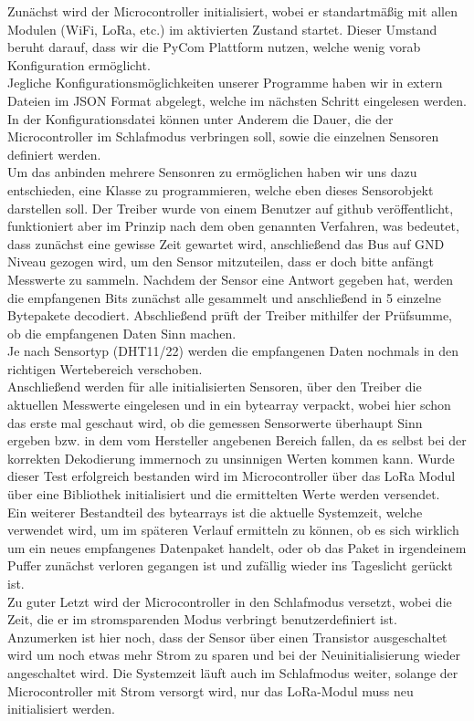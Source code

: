 Zunächst wird der Microcontroller initialisiert, wobei er standartmäßig mit allen Modulen (WiFi, LoRa, etc.) im aktivierten Zustand startet. Dieser Umstand beruht darauf, dass wir die PyCom Plattform nutzen, welche wenig vorab Konfiguration ermöglicht.\\
Jegliche Konfigurationsmöglichkeiten unserer Programme haben wir in extern Dateien im JSON Format abgelegt, welche im nächsten Schritt eingelesen werden. In der Konfigurationsdatei können unter Anderem die Dauer, die der Microcontroller im Schlafmodus verbringen soll, sowie die einzelnen Sensoren definiert werden.\\
Um das anbinden mehrere Sensonren zu ermöglichen haben wir uns dazu entschieden, eine Klasse zu programmieren, welche eben dieses Sensorobjekt darstellen soll. Der Treiber wurde von einem Benutzer auf github veröffentlicht\cite{dhtlib}, funktioniert aber im Prinzip nach dem oben genannten Verfahren, was bedeutet, dass zunächst eine gewisse Zeit gewartet wird, anschließend das Bus auf GND Niveau gezogen wird, um den Sensor mitzuteilen, dass er doch bitte anfängt Messwerte zu sammeln. Nachdem der Sensor eine Antwort gegeben hat, werden die empfangenen Bits zunächst alle gesammelt und anschließend in 5 einzelne Bytepakete decodiert. Abschließend prüft der Treiber mithilfer der Prüfsumme, ob die empfangenen Daten Sinn machen.\\ Je nach Sensortyp (DHT11/22) werden die empfangenen Daten nochmals in den richtigen Wertebereich \grqq verschoben\grqq.\\
Anschließend werden für alle initialisierten Sensoren, über den Treiber die aktuellen Messwerte eingelesen und in ein bytearray verpackt, wobei hier schon das erste mal geschaut wird, ob die gemessen Sensorwerte überhaupt Sinn ergeben bzw. in dem vom Hersteller angebenen Bereich fallen, da es selbst bei der korrekten Dekodierung immernoch zu unsinnigen Werten kommen kann. 
Wurde dieser Test erfolgreich bestanden wird im Microcontroller über das LoRa Modul über eine Bibliothek initialisiert und die ermittelten Werte werden versendet.\\ Ein weiterer Bestandteil des bytearrays ist die aktuelle Systemzeit, welche verwendet wird, um im späteren Verlauf ermitteln zu können, ob es sich wirklich um ein neues empfangenes Datenpaket handelt, oder ob das Paket in irgendeinem Puffer zunächst verloren gegangen ist und zufällig wieder ins Tageslicht gerückt ist.\\
Zu guter Letzt wird der Microcontroller in den Schlafmodus versetzt, wobei die Zeit, die er im stromsparenden Modus verbringt benutzerdefiniert ist. Anzumerken ist hier noch, dass der Sensor über einen Transistor ausgeschaltet wird um noch etwas mehr Strom zu sparen und bei der Neuinitialisierung wieder angeschaltet wird. Die Systemzeit läuft auch im Schlafmodus weiter, solange der Microcontroller mit Strom versorgt wird, nur das LoRa-Modul muss neu initialisiert werden.\\

